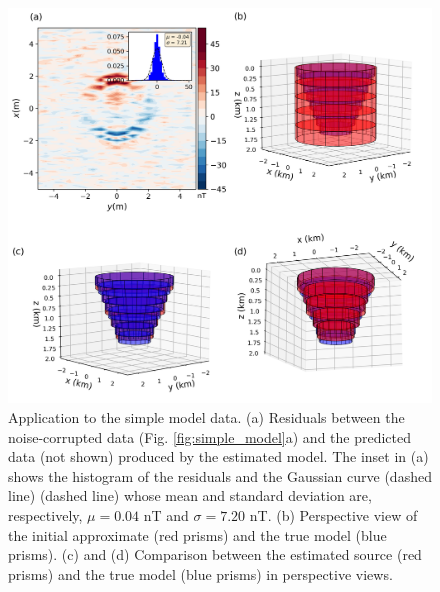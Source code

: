 \begin{figure}
	\centering
	\includegraphics[width=\linewidth]{figures/simple_results.png}
	\caption{Application to the simple model data. (a) Residuals between the  noise-corrupted data (Fig. \ref{fig:simple_model}a) and the predicted data (not shown) produced by the estimated model. The inset in (a) shows the histogram of the residuals and the Gaussian curve (dashed line) (dashed line) whose mean and standard deviation are, respectively, $\mu = 0.04$ nT and $\sigma=7.20$ nT. (b) Perspective view of the initial approximate (red prisms) and the true model (blue prisms). (c) and (d) Comparison between the estimated source (red prisms) and the true model (blue prisms) in perspective views.}
	\label{fig:simple_results}
\end{figure}


